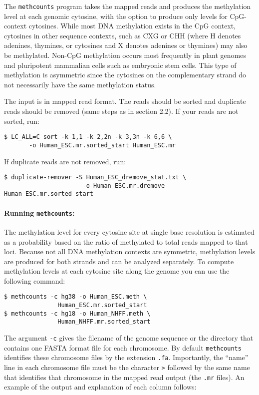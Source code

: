 \documentclass[10pt]{article}
\newcommand{\prog}[1]{\texttt{#1}}
\newcommand{\fn}[1]{\texttt{#1}}
\newcommand{\lit}[1]{\texttt{#1}}
\newcommand{\op}[1]{\texttt{#1}}
\begin{document}
The \prog{methcounts} program takes the mapped reads and produces the
methylation level at each genomic cytosine, with the option to produce
only levels for CpG-context cytosines.
While most DNA methylation exists in the CpG context, cytosines in
other sequence contexts, such as CXG or CHH (where H denotes adenines,
thymines, or cytosines and X denotes adenines or thymines) may also be
methylated. Non-CpG methylation occurs most frequently in plant genomes 
and pluripotent mammalian cells such as embryonic stem cells. This type
of methylation is asymmetric since the cytosines on the complementary 
strand do not necessarily have the same methylation status.

The input is in mapped read format. The reads should be sorted and duplicate
reads should be removed (same steps as in section 2.2). If your reads are not
sorted, run:

\begin{verbatim}
$ LC_ALL=C sort -k 1,1 -k 2,2n -k 3,3n -k 6,6 \
       -o Human_ESC.mr.sorted_start Human_ESC.mr
\end{verbatim}
If duplicate reads are not removed, run:

\begin{verbatim}
$ duplicate-remover -S Human_ESC_dremove_stat.txt \
                      -o Human_ESC.mr.dremove Human_ESC.mr.sorted_start
\end{verbatim}

\paragraph{Running \prog{methcounts}:}
The methylation level for every cytosine site at single base resolution
is estimated as a probability based on the ratio of methylated to total
reads mapped to that loci. Because not all DNA methylation contexts are
symmetric, methylation levels are produced for both strands and can be
analyzed separately. To compute methylation levels at each
cytosine site along the genome you can use the following command:

\begin{verbatim}
$ methcounts -c hg38 -o Human_ESC.meth \
               Human_ESC.mr.sorted_start
$ methcounts -c hg18 -o Human_NHFF.meth \
               Human_NHFF.mr.sorted_start
\end{verbatim}

The argument \op{-c} gives the filename of the genome sequence or the
directory that contains one FASTA format file for each chromosome. By
default \prog{methcounts} identifies these chromosome files by the
extension \fn{.fa}. Importantly, the ``name'' line in each chromosome
file must be the character \lit{>} followed by the same name that
identifies that chromosome in the mapped read output (the \fn{.mr}
files). An example of the output and explanation of each column follows:
\end{document}
